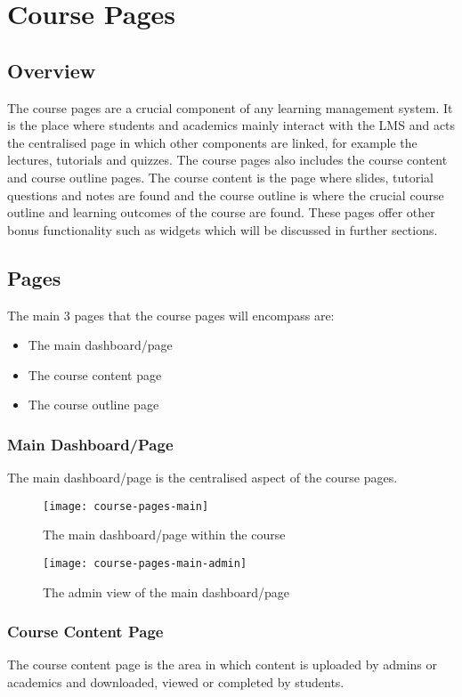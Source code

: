 \section{Course Pages}
\subsection{Overview}
The course pages are a crucial component of any learning management system. It is the place where students and academics mainly interact with the LMS and acts the centralised page in which other components are linked, for example the lectures, tutorials and quizzes. 
The course pages also includes the course content and course outline pages. The course content is the page where slides, tutorial questions and notes are found and the course outline is where the crucial course outline and learning outcomes of the course are found.
These pages offer other bonus functionality such as widgets which will be discussed in further sections.

\subsection{Pages}
The main 3 pages that the course pages will encompass are:
\begin{itemize}
    \item The main dashboard/page
    \item The course content page
    \item The course outline page
\end{itemize}

\subsubsection{Main Dashboard/Page}
The main dashboard/page is the centralised aspect of the course pages.
\begin{figure}[h]
    \centering
    \texttt{[image: course-pages-main]}
    \caption{The main dashboard/page within the course}
\end{figure}
\begin{figure}[h]
    \centering
    \texttt{[image: course-pages-main-admin]}
    \caption{The admin view of the main dashboard/page}
\end{figure}

\subsubsection{Course Content Page}
The course content page is the area in which content is uploaded by admins or academics and downloaded, viewed or completed by students.

